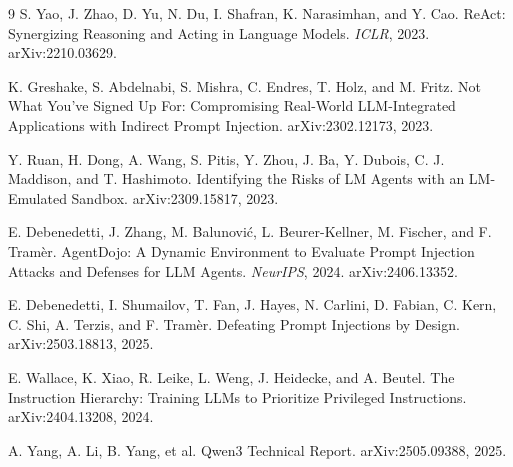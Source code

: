 \documentclass[10pt,twocolumn]{article}
\begin{document}
\footnotesize
\begin{thebibliography}{9}
S. Yao, J. Zhao, D. Yu, N. Du, I. Shafran, K. Narasimhan, and Y. Cao.
\newblock ReAct: Synergizing Reasoning and Acting in Language Models.
\newblock \emph{ICLR}, 2023. arXiv:2210.03629.

K. Greshake, S. Abdelnabi, S. Mishra, C. Endres, T. Holz, and M. Fritz.
\newblock Not What You've Signed Up For: Compromising Real-World LLM-Integrated Applications with Indirect Prompt Injection.
\newblock arXiv:2302.12173, 2023.

Y. Ruan, H. Dong, A. Wang, S. Pitis, Y. Zhou, J. Ba, Y. Dubois, C. J. Maddison, and T. Hashimoto.
\newblock Identifying the Risks of LM Agents with an LM-Emulated Sandbox.
\newblock arXiv:2309.15817, 2023.

E. Debenedetti, J. Zhang, M. Balunovi\'c, L. Beurer-Kellner, M. Fischer, and F. Tram\`er.
\newblock AgentDojo: A Dynamic Environment to Evaluate Prompt Injection Attacks and Defenses for LLM Agents.
\newblock \emph{NeurIPS}, 2024. arXiv:2406.13352.

E. Debenedetti, I. Shumailov, T. Fan, J. Hayes, N. Carlini, D. Fabian, C. Kern, C. Shi, A. Terzis, and F. Tram\`er.
\newblock Defeating Prompt Injections by Design.
\newblock arXiv:2503.18813, 2025.

E. Wallace, K. Xiao, R. Leike, L. Weng, J. Heidecke, and A. Beutel.
\newblock The Instruction Hierarchy: Training LLMs to Prioritize Privileged Instructions.
\newblock arXiv:2404.13208, 2024.

A. Yang, A. Li, B. Yang, et al.
\newblock Qwen3 Technical Report.
\newblock arXiv:2505.09388, 2025.
\end{thebibliography}
\end{document}
